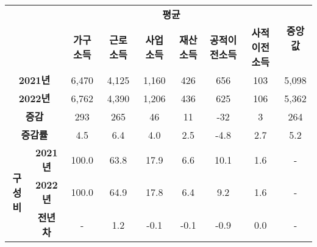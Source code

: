 \begin{tabular}{c|c|c|c|c|c|c|c|c}
\toprule
\multicolumn{2}{c|}{} & \multicolumn{6}{c|}{\textbf{평균}} & \multirow{2}{*}{\textbf{중앙값}} \\ \cline{3-8}
\multicolumn{2}{c|}{} & \textbf{가구소득} & \textbf{근로소득} & \textbf{사업소득} & \textbf{재산소득} & \textbf{공적이전소득} & \textbf{사적이전소득} & \\ \midrule \midrule
\multicolumn{2}{c|}{\textbf{2021년}} & 6,470 & 4,125 & 1,160 & 426 & 656 & 103 & 5,098 \\ 
\multicolumn{2}{c|}{\textbf{2022년}} & 6,762 & 4,390 & 1,206 & 436 & 625 & 106 & 5,362 \\ \hline
\multicolumn{2}{c|}{\textbf{증감}}   & 293 & 265 & 46 & 11 & -32 & 3 & 264 \\ \hline
\multicolumn{2}{c|}{\textbf{증감률}} & 4.5 & 6.4 & 4.0 & 2.5 & -4.8 & 2.7 & 5.2 \\ \hline
\multirow{3}{*}{\textbf{구성비}} & \textbf{2021년} & 100.0 & \cellcolor{myblue}63.8 & 17.9 & 6.6 & 10.1 & 1.6 & - \\
 & \textbf{2022년} & 100.0 & \cellcolor{myblue}64.9 & 17.8 & 6.4 & 9.2 & 1.6 & - \\ \cline{2-9}
 & \textbf{전년차}& - & 1.2 & -0.1 & -0.1 & -0.9 & 0.0 & - \\ \bottomrule
\end{tabular}
